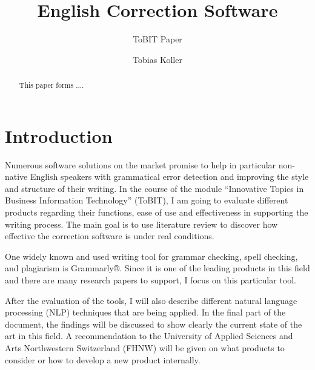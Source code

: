 \documentclass[runningheads]{llncs}
\let\OldTextregistered\textregistered
\renewcommand{\textregistered}{\OldTextregistered\xspace}%
\begin{document}
\title{English Correction Software}
\subtitle{ToBIT Paper}

\author{Tobias Koller}



\maketitle              %


\begin{abstract}
This paper forms ....

\end{abstract}



\section{Introduction}
Numerous software solutions on the market promise to help in particular non-native English speakers with grammatical error detection and improving the style and structure of their writing. In the course of the module ``Innovative Topics in Business Information Technology'' (ToBIT), I am going to evaluate different products regarding their functions, ease of use and effectiveness in supporting the writing process. The main goal is to use literature review to discover how effective the correction software is under real conditions.

One widely known and used writing tool for grammar checking, spell checking, and plagiarism is Grammarly\textregistered®. Since it is one of the leading products in this field and there are many research papers to support, I focus on this particular tool.

After the evaluation of the tools, I will also describe different natural language processing (NLP) techniques that are being applied. In the final part of the document, the findings will be discussed to show clearly the current state of the art in this field. A recommendation to the University of Applied Sciences and Arts Northwestern Switzerland (FHNW) will be given on what products to consider or how to develop a new product internally.
\end{document}
